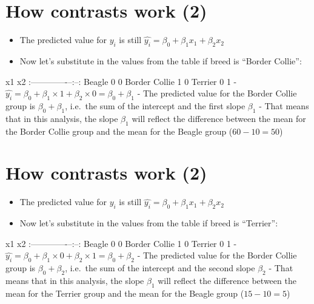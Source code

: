 \documentclass[]{article}
\begin{document}
\section{How contrasts work (2)}\label{how-contrasts-work-2}

\begin{itemize}
\itemsep1pt\parskip0pt
\item
  The predicted value for $y_i$ is still
  $\hat{y_i} = \beta_0 + \beta_1 x_{1} + \beta_2 x_{2}$
\item
  Now let's substitute in the values from the table if breed is ``Border
  Collie'':
\end{itemize}

\textbar{} \textbar{} x1\textbar{} x2\textbar{}
\textbar{}:-------------\textbar{}--:\textbar{}--:\textbar{}
\textbar{}Beagle \textbar{} 0\textbar{} 0\textbar{} \textbar{}Border
Collie \textbar{} 1\textbar{} 0\textbar{} \textbar{}Terrier \textbar{}
0\textbar{} 1\textbar{} -
$\hat{y_{i}} = \beta_0 + \beta_1 \times 1 + \beta_2 \times 0 = \beta_0 + \beta_1$
- The predicted value for the Border Collie group is
$\beta_0 + \beta_1$, i.e.~the sum of the intercept and the first slope
$\beta_1$ - That means that in this analysis, the slope $\beta_1$ will
reflect the difference between the mean for the Border Collie group and
the mean for the Beagle group ($60 - 10 = 50$)

\section{How contrasts work (2)}\label{how-contrasts-work-2-1}

\begin{itemize}
\itemsep1pt\parskip0pt
\item
  The predicted value for $y_i$ is still
  $\hat{y_i} = \beta_0 + \beta_1 x_{1} + \beta_2 x_{2}$
\item
  Now let's substitute in the values from the table if breed is
  ``Terrier'':
\end{itemize}

\textbar{} \textbar{} x1\textbar{} x2\textbar{}
\textbar{}:-------------\textbar{}--:\textbar{}--:\textbar{}
\textbar{}Beagle \textbar{} 0\textbar{} 0\textbar{} \textbar{}Border
Collie \textbar{} 1\textbar{} 0\textbar{} \textbar{}Terrier \textbar{}
0\textbar{} 1\textbar{} -
$\hat{y_{i}} = \beta_0 + \beta_1 \times 0 + \beta_2 \times 1 = \beta_0 + \beta_2$
- The predicted value for the Border Collie group is
$\beta_0 + \beta_2$, i.e.~the sum of the intercept and the second slope
$\beta_2$ - That means that in this analysis, the slope $\beta_1$ will
reflect the difference between the mean for the Terrier group and the
mean for the Beagle group ($15 - 10 = 5$)
\end{document}
